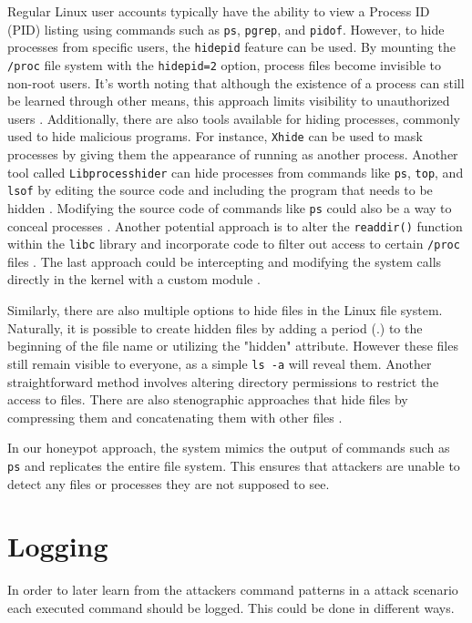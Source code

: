 Regular Linux user accounts typically have the ability to view a Process ID (PID) listing using commands such as \texttt{ps}, \texttt{pgrep}, and \texttt{pidof}. However, to hide processes from specific users, the \texttt{hidepid} feature can be used. By mounting the \texttt{/proc} file system with the \texttt{hidepid=2} option, process files become invisible to non-root users. It's worth noting that although the existence of a process can still be learned through other means, this approach limits visibility to unauthorized users \cite{emad-al-mousa_how_2022}.
Additionally, there are also tools available for hiding processes, commonly used to hide malicious programs. For instance, \texttt{Xhide} can be used to mask processes by giving them the appearance of running as another process. Another tool called \texttt{Libprocesshider} can hide processes from commands like \texttt{ps}, \texttt{top}, and \texttt{lsof} by editing the source code and including the program that needs to be hidden \cite{noauthor_difference_2020}.
Modifying the source code of commands like \texttt{ps} could also be a way to conceal processes \cite{noauthor_difference_2020, borello_hiding_2014}.
Another potential approach is to alter the \texttt{readdir()} function within the \texttt{libc} library and incorporate code to filter out access to certain \texttt{/proc} files \cite{borello_hiding_2014}. The last approach could be intercepting and modifying the system calls directly in the kernel with a custom module \cite{borello_hiding_2014}.

Similarly, there are also multiple options to hide files in the Linux file system. Naturally, it is possible to create hidden files by adding a period (.) to the beginning of the file name or utilizing the "hidden" attribute. However these files still remain visible to everyone, as a simple \texttt{ls -a} will reveal them. Another straightforward method involves altering directory permissions to restrict the access to files. There are also stenographic approaches that hide files by compressing them and concatenating them with other files \cite{sk_steganography_2019}.

In our honeypot approach, the system mimics the output of commands such as \texttt{ps} and replicates the entire file system. This ensures that attackers are unable to detect any files or processes they are not supposed to see. 

\section{Logging}
In order to later learn from the attackers command patterns in a attack scenario each executed command should be logged. This could be done in different ways. 

